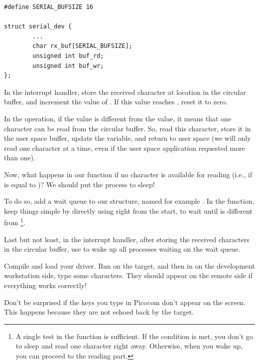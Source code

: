 \begin{verbatim}
#define SERIAL_BUFSIZE 16

struct serial_dev {
        ...
        char rx_buf[SERIAL_BUFSIZE];
        unsigned int buf_rd;
        unsigned int buf_wr;
};
\end{verbatim}

In the interrupt handler, store the received character at location
 in the circular buffer, and increment the value
of . If this value reaches ,
reset it to zero.

In the  operation, if the  value is
different from the  value, it means that one
character can be read from the circular buffer. So, read this
character, store it in the user space buffer, update the
 variable, and return to user space (we will only
read one character at a time, even if the user space application
requested more than one).

Now, what happens in our  function if no character is
available for reading (i.e., if  is equal to
)? We should put the process to sleep!

To do so, add a  wait queue to our
 structure, named for example . In the
 function, keep things simple by directly using
 right from the start, to wait until
 is different from \footnote{A single test in the
 function is sufficient. If the
condition is met, you don't go to sleep and read one character right away.
Otherwise, when you wake up, you can proceed to the reading part.}.

Last but not least, in the interrupt handler,
after storing the received characters in the circular buffer, use
 to wake up all processes waiting on the wait queue.

Compile and load your driver. Run 
on the target, and then in  on the development
workstation side, type some characters. They should appear on the
remote side if everything works correctly!

Don't be surprised if the keys you type in Picocom don't appear on the
screen. This happens because they are not echoed back by the target.
